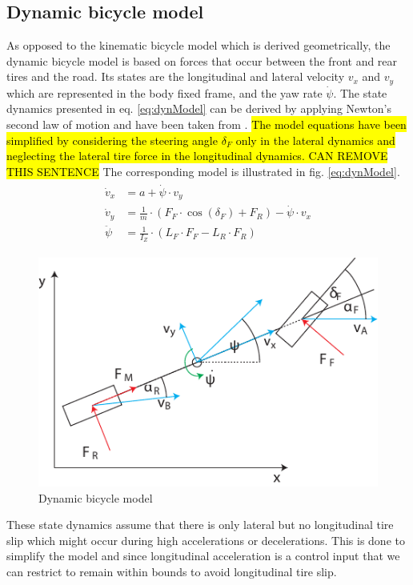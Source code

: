 \subsection{Dynamic bicycle model}
As opposed to the kinematic bicycle model which is derived geometrically, the dynamic bicycle model is based on forces that occur between the front and rear tires and the road. Its states are the longitudinal and lateral velocity $v_x$ and $v_y$ which are represented in the body fixed frame, and the yaw rate $\dot \psi$. The state dynamics presented in eq. \ref{eq:dynModel} can be derived by applying Newton's second law of motion and have been taken from \cite{Kong2015}. \hl{The model equations have been simplified by considering the steering angle $\delta_F$ only in the lateral dynamics and neglecting the lateral tire force in the longitudinal dynamics. CAN REMOVE THIS SENTENCE} The corresponding model is illustrated in fig. \ref{eq:dynModel}.
\begin{align}
\begin{split}
\label{eq:dynModel}
    \dot v_x &= a+\dot \psi\cdot v_y\\
    \dot v_y &= \frac{1}{m}\cdot (F_F\cdot \cos(\delta_F)+F_R)-\dot\psi\cdot v_x\\
    \ddot \psi &= \frac{1}{I_Z}\cdot(L_F\cdot F_F - L_R\cdot F_R)
\end{split}
\end{align}
\begin{figure}[ht]
	\centering
  	\includegraphics{../../Figures/Models/DynModel.pdf}
	\caption{Dynamic bicycle model}
	\label{fig:dynModel}
\end{figure}
These state dynamics assume that there is only lateral but no longitudinal tire slip which might occur during high accelerations or decelerations. This is done to simplify the model and since longitudinal acceleration is a control input that we can restrict to remain within bounds to avoid longitudinal tire slip.
